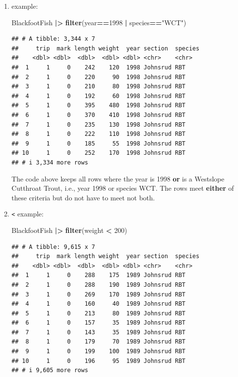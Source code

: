 \documentclass[
  10pt,
  letterpaper,
  twoside,
  openright]{book}
\newenvironment{Shaded}{\begin{snugshade}}{\end{snugshade}}
\newcommand{\DecValTok}[1]{\textcolor[rgb]{0.00,0.00,0.81}{#1}}
\newcommand{\FunctionTok}[1]{\textcolor[rgb]{0.13,0.29,0.53}{\textbf{#1}}}
\newcommand{\NormalTok}[1]{#1}
\newcommand{\SpecialCharTok}[1]{\textcolor[rgb]{0.81,0.36,0.00}{\textbf{#1}}}
\newcommand{\StringTok}[1]{\textcolor[rgb]{0.31,0.60,0.02}{#1}}
\begin{document}
\begin{enumerate}
  The code above keeps all rows where the year is 1998 for Westslope
  Cutthroat Trout, i.e., year 1998 and species WCT. The rows meet
  \textbf{both} of these criteria.
\item
  \texttt{\textbar{}} example:

\begin{Shaded}
\begin{Highlighting}[]
\NormalTok{BlackfootFish }\SpecialCharTok{|\textgreater{}}
  \FunctionTok{filter}\NormalTok{(year}\SpecialCharTok{==}\DecValTok{1998} \SpecialCharTok{|}\NormalTok{ species}\SpecialCharTok{==}\StringTok{"WCT"}\NormalTok{)}
\end{Highlighting}
\end{Shaded}

\begin{verbatim}
## # A tibble: 3,344 x 7
##     trip  mark length weight  year section  species
##    <dbl> <dbl>  <dbl>  <dbl> <dbl> <chr>    <chr>  
##  1     1     0    242    120  1998 Johnsrud RBT    
##  2     1     0    220     90  1998 Johnsrud RBT    
##  3     1     0    210     80  1998 Johnsrud RBT    
##  4     1     0    192     60  1998 Johnsrud RBT    
##  5     1     0    395    480  1998 Johnsrud RBT    
##  6     1     0    370    410  1998 Johnsrud RBT    
##  7     1     0    235    130  1998 Johnsrud RBT    
##  8     1     0    222    110  1998 Johnsrud RBT    
##  9     1     0    185     55  1998 Johnsrud RBT    
## 10     1     0    252    170  1998 Johnsrud RBT    
## # i 3,334 more rows
\end{verbatim}

  The code above keeps all rows where the year is 1998 \textbf{or} is a
  Westslope Cutthroat Trout, i.e., year 1998 or species WCT. The rows
  meet \textbf{either} of these criteria but do not have to meet not
  both.
\item
  \texttt{\textless{}} example:

\begin{Shaded}
\begin{Highlighting}[]
\NormalTok{BlackfootFish }\SpecialCharTok{|\textgreater{}}
  \FunctionTok{filter}\NormalTok{(weight }\SpecialCharTok{\textless{}} \DecValTok{200}\NormalTok{)}
\end{Highlighting}
\end{Shaded}

\begin{verbatim}
## # A tibble: 9,615 x 7
##     trip  mark length weight  year section  species
##    <dbl> <dbl>  <dbl>  <dbl> <dbl> <chr>    <chr>  
##  1     1     0    288    175  1989 Johnsrud RBT    
##  2     1     0    288    190  1989 Johnsrud RBT    
##  3     1     0    269    170  1989 Johnsrud RBT    
##  4     1     0    160     40  1989 Johnsrud RBT    
##  5     1     0    213     80  1989 Johnsrud RBT    
##  6     1     0    157     35  1989 Johnsrud RBT    
##  7     1     0    143     35  1989 Johnsrud RBT    
##  8     1     0    179     70  1989 Johnsrud RBT    
##  9     1     0    199    100  1989 Johnsrud RBT    
## 10     1     0    196     95  1989 Johnsrud RBT    
## # i 9,605 more rows
\end{verbatim}


\end{enumerate}
\end{document}
